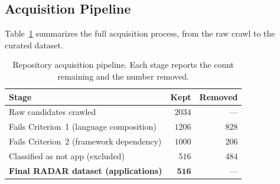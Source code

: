 \subsection{Acquisition Pipeline}

Table~\ref{tab:pipeline} summarizes the full acquisition process, from the raw crawl to the curated dataset.
 
\begin{table}[t]
\centering
\renewcommand{\arraystretch}{1.2}
\setlength{\tabcolsep}{6pt}
\caption{Repository acquisition pipeline. Each stage reports the count
remaining and the number removed.}
\label{tab:pipeline}
\begin{tabular}{@{}>{\raggedright\arraybackslash}p{}rr@{}}
\toprule
\textbf{Stage} & \textbf{Kept} & \textbf{Removed} \\
\midrule
Raw candidates crawled                       & $2034$ & --- \\
Fails Criterion~1 (language composition)     & $1206$ & $828$ \\
Fails Criterion~2 (framework dependency)     & $1000$ & $206$ \\
Classified as not app (excluded)           & $516$ & $484$ \\
\midrule
\textbf{Final RADAR dataset (applications)}  & $\mathbf{516}$ & --- \\
\bottomrule
\end{tabular}
\end{table}

